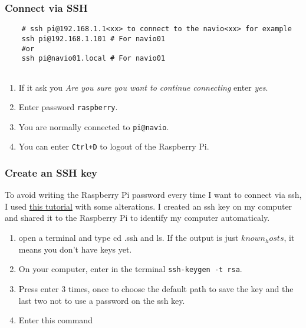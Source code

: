             \subsubsection{Connect via SSH}
            
                \begin{verbatim}
    # ssh pi@192.168.1.1<xx> to connect to the navio<xx> for example
    ssh pi@192.168.1.101 # For navio01
    #or
    ssh pi@navio01.local # For navio01
    
                \end{verbatim}
                
                \begin{enumerate}
                    \item If it ask you \emph{Are you sure you want to continue connecting} enter \emph{yes}.
                    \item Enter password \texttt{raspberry}.
                    \item You are normally connected to \texttt{pi@navio}.
                    \item You can enter \texttt{Ctrl+D} to logout of the Raspberry Pi.
                \end{enumerate}
                
            \subsubsection{Create an SSH key}
                To avoid writing the Raspberry Pi password every time I want to connect via ssh, I used \href{https://www.ssh.com/ssh/copy-id}{this tutorial} with some alterations. I created an ssh key on my computer and shared it to the Raspberry Pi to identify my computer automaticaly.
                
                \begin{enumerate}
                    \item open a terminal and type cd .ssh and ls. If the output is just $known_hosts$, it means you don't have keys yet.
                    \item On your computer, enter in the terminal \texttt{ssh-keygen -t rsa}.
                    \item Press enter 3 times, once to choose the default path to save the key and the last two not to use a password on the ssh key.
                    \item Enter this command
                \end{enumerate}
                
